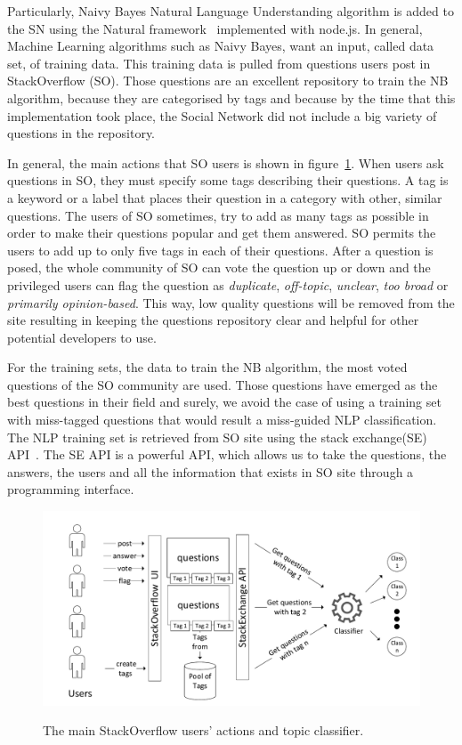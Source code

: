 Particularly, Naivy Bayes Natural Language Understanding algorithm is added to the SN using the Natural framework~\cite{nodenatural_url} implemented with node.js. In general, Machine Learning algorithms such as Naivy Bayes, want an input, called data set, of training data. This training data is pulled from questions users post in StackOverflow (SO). Those questions are an excellent repository to train the NB algorithm, because they are categorised by tags and because by the time that this implementation took place, the Social Network did not include a big variety of questions in the repository.

In general, the main actions that SO users is shown in figure~\ref{fig:stackoverflow_questions}. When users ask questions in SO, they must specify some tags describing their questions. A tag is a keyword or a label that places their question in a category with other, similar questions. The users of SO sometimes, try to add as many tags as possible in order to make their questions popular and get them answered. SO permits the users to add up to only five tags in each of their questions. After a question is posed, the whole community of SO can vote the question up or down and the privileged users can flag the question as \emph{duplicate}, \emph{off-topic}, \emph{unclear}, \emph{too broad} or \emph{primarily opinion-based}. This way, low quality questions will be removed from the site resulting in keeping the questions repository clear and helpful for other potential developers to use.

For the training sets, the data to train the NB algorithm, the most voted questions of the SO community are used. Those questions have emerged as the best questions in their field and surely, we avoid the case of using a training set with miss-tagged questions that would result a miss-guided NLP classification. The NLP training set is retrieved from SO site using the stack exchange(SE) API~\cite{stackexchange_url}. The SE API is a powerful API, which allows us to take the questions, the answers, the users and all the information that exists in SO site through a programming interface.

\begin{figure}[h]
	\caption{The main StackOverflow users' actions and topic classifier. }
	\includegraphics[width=1\textwidth]{./fig/StackOverFlow.pdf}
	\centering
	\label{fig:stackoverflow_questions}
\end{figure}


